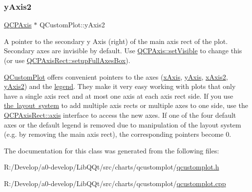 \subsubsection{\texorpdfstring{y\+Axis2}{yAxis2}}
{\footnotesize\ttfamily \mbox{\hyperlink{class_q_c_p_axis}{Q\+C\+P\+Axis}} $\ast$ Q\+Custom\+Plot\+::y\+Axis2}

A pointer to the secondary y Axis (right) of the main axis rect of the plot. Secondary axes are invisible by default. Use \mbox{\hyperlink{class_q_c_p_layerable_a3bed99ddc396b48ce3ebfdc0418744f8}{Q\+C\+P\+Axis\+::set\+Visible}} to change this (or use \mbox{\hyperlink{class_q_c_p_axis_rect_a5fa906175447b14206954f77fc7f1ef4}{Q\+C\+P\+Axis\+Rect\+::setup\+Full\+Axes\+Box}}).

\mbox{\hyperlink{class_q_custom_plot}{Q\+Custom\+Plot}} offers convenient pointers to the axes (\mbox{\hyperlink{class_q_custom_plot_a9a79cd0158a4c7f30cbc702f0fd800e4}{x\+Axis}}, \mbox{\hyperlink{class_q_custom_plot_af6fea5679725b152c14facd920b19367}{y\+Axis}}, \mbox{\hyperlink{class_q_custom_plot_ada41599f22cad901c030f3dcbdd82fd9}{x\+Axis2}}, \mbox{\hyperlink{class_q_custom_plot_af13fdc5bce7d0fabd640f13ba805c0b7}{y\+Axis2}}) and the \mbox{\hyperlink{class_q_custom_plot_a4eadcd237dc6a09938b68b16877fa6af}{legend}}. They make it very easy working with plots that only have a single axis rect and at most one axis at each axis rect side. If you use \mbox{\hyperlink{}{the layout system}} to add multiple axis rects or multiple axes to one side, use the \mbox{\hyperlink{class_q_c_p_axis_rect_a583ae4f6d78b601b732183f6cabecbe1}{Q\+C\+P\+Axis\+Rect\+::axis}} interface to access the new axes. If one of the four default axes or the default legend is removed due to manipulation of the layout system (e.\+g. by removing the main axis rect), the corresponding pointers become 0. 

The documentation for this class was generated from the following files\+:\begin{DoxyCompactItemize}
\item 
R\+:/\+Develop/a0-\/develop/\+Lib\+Q\+Qt/src/charts/qcustomplot/\mbox{\hyperlink{qcustomplot_8h}{qcustomplot.\+h}}\item 
R\+:/\+Develop/a0-\/develop/\+Lib\+Q\+Qt/src/charts/qcustomplot/\mbox{\hyperlink{qcustomplot_8cpp}{qcustomplot.\+cpp}}\end{DoxyCompactItemize}
